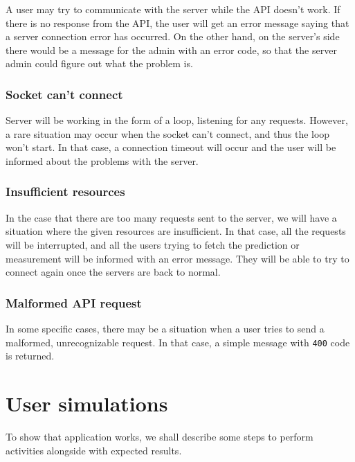\documentclass[titlepage]{article}
\begin{document}
A user may try to communicate with the server while the API doesn't work. If there is no response from the API, the user will get an error message saying that a server connection error has occurred. On the other hand, on the server's side there would be a message for the admin with an error code, so that the server admin could figure out what the problem is.

\subsubsection{Socket can't connect}

Server will be working in the form of a loop, listening for any requests. However, a rare situation may occur when the socket can't connect, and thus the loop won't start. In that case, a connection timeout will occur and the user will be informed about the problems with the server.

\subsubsection{Insufficient resources}

In the case that there are too many requests sent to the server, we will have a situation where the given resources are insufficient. In that case, all the requests will be interrupted, and all the users trying to fetch the prediction or measurement will be informed with an error message. They will be able to try to connect again once the servers are back to normal.

\subsubsection{Malformed API request}

In some specific cases, there may be a situation when a user tries to send a malformed, unrecognizable request. In that case, a simple message with \texttt{400} code is returned.

\newpage

\section{User simulations}

To show that application works, we shall describe some steps to perform activities alongside with expected results.
\end{document}
